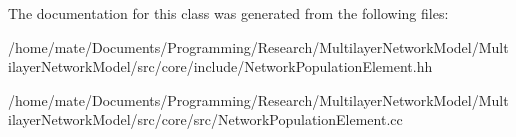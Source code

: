 The documentation for this class was generated from the following files\+:\begin{DoxyCompactItemize}
\item 
/home/mate/\+Documents/\+Programming/\+Research/\+Multilayer\+Network\+Model/\+Multilayer\+Network\+Model/src/core/include/Network\+Population\+Element.\+hh\item 
/home/mate/\+Documents/\+Programming/\+Research/\+Multilayer\+Network\+Model/\+Multilayer\+Network\+Model/src/core/src/Network\+Population\+Element.\+cc\end{DoxyCompactItemize}

